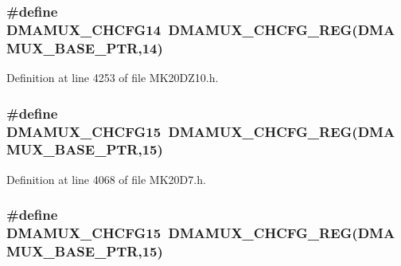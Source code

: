 \subsubsection[{\texorpdfstring{D\+M\+A\+M\+U\+X\+\_\+\+C\+H\+C\+F\+G14}{DMAMUX_CHCFG14}}]{\setlength{\rightskip}{0pt plus 5cm}\#define D\+M\+A\+M\+U\+X\+\_\+\+C\+H\+C\+F\+G14~{\bf D\+M\+A\+M\+U\+X\+\_\+\+C\+H\+C\+F\+G\+\_\+\+R\+EG}({\bf D\+M\+A\+M\+U\+X\+\_\+\+B\+A\+S\+E\+\_\+\+P\+TR},14)}\hypertarget{group___d_m_a_m_u_x___register___accessor___macros_ga1e88648507c6b0683b2a904f3dc274e1}{}\label{group___d_m_a_m_u_x___register___accessor___macros_ga1e88648507c6b0683b2a904f3dc274e1}


Definition at line 4253 of file M\+K20\+D\+Z10.\+h.

\subsubsection[{\texorpdfstring{D\+M\+A\+M\+U\+X\+\_\+\+C\+H\+C\+F\+G15}{DMAMUX_CHCFG15}}]{\setlength{\rightskip}{0pt plus 5cm}\#define D\+M\+A\+M\+U\+X\+\_\+\+C\+H\+C\+F\+G15~{\bf D\+M\+A\+M\+U\+X\+\_\+\+C\+H\+C\+F\+G\+\_\+\+R\+EG}({\bf D\+M\+A\+M\+U\+X\+\_\+\+B\+A\+S\+E\+\_\+\+P\+TR},15)}\hypertarget{group___d_m_a_m_u_x___register___accessor___macros_gaa445f96fc79c66e60c1a1431561075dd}{}\label{group___d_m_a_m_u_x___register___accessor___macros_gaa445f96fc79c66e60c1a1431561075dd}


Definition at line 4068 of file M\+K20\+D7.\+h.

\subsubsection[{\texorpdfstring{D\+M\+A\+M\+U\+X\+\_\+\+C\+H\+C\+F\+G15}{DMAMUX_CHCFG15}}]{\setlength{\rightskip}{0pt plus 5cm}\#define D\+M\+A\+M\+U\+X\+\_\+\+C\+H\+C\+F\+G15~{\bf D\+M\+A\+M\+U\+X\+\_\+\+C\+H\+C\+F\+G\+\_\+\+R\+EG}({\bf D\+M\+A\+M\+U\+X\+\_\+\+B\+A\+S\+E\+\_\+\+P\+TR},15)}\hypertarget{group___d_m_a_m_u_x___register___accessor___macros_gaa445f96fc79c66e60c1a1431561075dd}{}\label{group___d_m_a_m_u_x___register___accessor___macros_gaa445f96fc79c66e60c1a1431561075dd}


